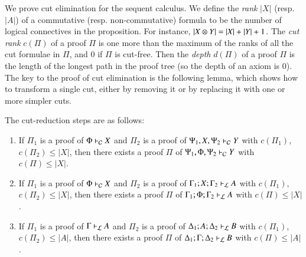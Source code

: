 We prove cut elimination for the sequent calculus. We define the
\textit{rank} $|X|$ (resp. $|A|$) of a commutative (resp. non-commutative)
formula to be the number of logical connectives in the proposition. For
instance, $|\mathit{X}  \otimes  \mathit{Y}| = |\mathit{X}| + |\mathit{Y}| + 1$. The \textit{cut rank}
$c(\Pi)$ of a proof $\Pi$ is one more than the maximum of the ranks of all
the cut formulae in $\Pi$, and $0$ if $\Pi$ is cut-free. Then the
\textit{depth} $d(\Pi)$ of a proof $\Pi$ is the length of the longest path
in the proof tree (so the depth of an axiom is $0$). The key to the proof
of cut elimination is the following lemma, which shows how to transform a
single cut, either by removing it or by replacing it with one or more
simpler cuts.
\begin{lemma}
  \label{lem:cut-reduction}
  The cut-reduction steps are as follows:
  \begin{enumerate}
  \item If $\Pi_1$ is a proof of $\Phi  \vdash_\mathcal{C}  \mathit{X}$ and $\Pi_2$ is a proof of
  $\Psi_{{\mathrm{1}}}  ,  \mathit{X}  ,  \Psi_{{\mathrm{2}}}  \vdash_\mathcal{C}  \mathit{Y}$ with $c(\Pi_1)$, $c(\Pi_2)\leq |X|$, then there exists
  a proof $\Pi$ of $\Psi_{{\mathrm{1}}}  ,  \Phi  ,  \Psi_{{\mathrm{2}}}  \vdash_\mathcal{C}  \mathit{Y}$ with $c(\Pi)\leq |X|$.
  \item If $\Pi_1$ is a proof of $\Phi  \vdash_\mathcal{C}  \mathit{X}$ and $\Pi_2$ is a proof of
  $\Gamma_{{\mathrm{1}}}  ;  \mathit{X}  ;  \Gamma_{{\mathrm{2}}}  \vdash_\mathcal{L}  \mathit{A}$ with $c(\Pi_1)$, $c(\Pi_2)\leq |X|$, then there
  exists a proof $\Pi$ of $\Gamma_{{\mathrm{1}}}  ;  \Phi  ;  \Gamma_{{\mathrm{2}}}  \vdash_\mathcal{L}  \mathit{A}$ with $c(\Pi)\leq |X|$.
  \item If $\Pi_1$ is a proof of $\Gamma  \vdash_\mathcal{L}  \mathit{A}$ and $\Pi_2$ is a proof of
  $\Delta_{{\mathrm{1}}}  ;  \mathit{A}  ;  \Delta_{{\mathrm{2}}}  \vdash_\mathcal{L}  \mathit{B}$ with $c(\Pi_1)$, $c(\Pi_2)\leq |A|$, then there
  exists a proof $\Pi$ of $\Delta_{{\mathrm{1}}}  ;  \Gamma  ;  \Delta_{{\mathrm{2}}}  \vdash_\mathcal{L}  \mathit{B}$ with $c(\Pi)\leq |A|$.
  \end{enumerate}
\end{lemma}
